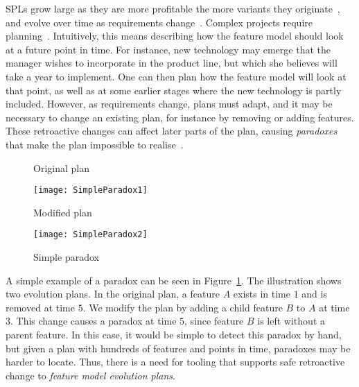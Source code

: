 SPLs grow large as they are more profitable the more variants they originate~\cite{book:introduction-to-spl}, %
and evolve over time as requirements change~\cite{art:context-aware-reconfiguration-in-evolving-software-product-lines, art:darwinspl-an-integrated-tool-suite-for-modeling-evolving-context-aware-software-product-lines}. Complex projects require planning~\cite{art:evofm-feature-driven-planning-of-product-line-evolution}. Intuitively, this means describing how the feature model should look at a future point in time. For instance, new technology may emerge that the manager wishes to incorporate in the product line, but which she believes will take a year to implement. One can then plan how the feature model will look at that point, as well as at some earlier stages where the new technology is partly included. However, as requirements change, plans must adapt, and it may be necessary to change an existing plan, for instance by removing or adding features. These retroactive changes can affect later parts of the plan, causing \emph{paradoxes} that make the plan impossible to realise~\cite{art:anomaly-detection-and-explanation-in-context-aware-software-product-lines}. 

\begin{figure}
   \begin{centering}
      \begin{minipage}[t]{0.42\textwidth}
         \vspace{0pt}
         \small
         \begin{center}
            Original plan
         \end{center}
         \texttt{[image: SimpleParadox1]}
      \end{minipage}\hfill
      \begin{minipage}[t]{0.56\textwidth}
         \vspace{0pt}
         \small
          \begin{center}
             Modified plan
          \end{center} 
         \texttt{[image: SimpleParadox2]}
      \end{minipage}
   \end{centering}
   \caption{Simple paradox}
   \label{ex:simple-paradox}
\end{figure}

A simple example of a paradox can be seen in Figure~\ref{ex:simple-paradox}. The illustration shows two evolution plans. In the original plan, a feature $A$ exists in time $1$ and is removed at time $5$. We modify the plan by adding a child feature $B$ to $A$ at time $3$. This change causes a paradox at time $5$, since feature $B$ is left without a parent feature. In this case, it would be simple to detect this paradox by hand, but given a plan with hundreds of features and points in time, paradoxes may be harder to locate.  Thus, there is a need for tooling that supports safe retroactive change to \emph{feature model evolution plans}. 

